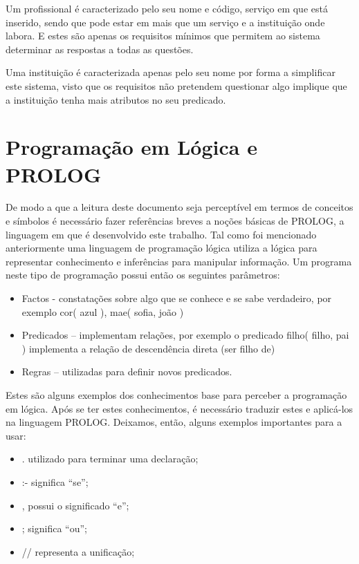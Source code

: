 Um profissional é caracterizado pelo seu nome e código, serviço em que está inserido, sendo que pode estar em mais que um serviço e a instituição onde labora. E estes são apenas os requisitos mínimos que permitem ao sistema determinar as respostas a todas as questões.

Uma instituição é caracterizada apenas pelo seu nome por forma a simplificar este sistema, visto que os requisitos não pretendem questionar algo implique que a instituição tenha mais atributos no seu predicado. 


\section{Programação em Lógica e PROLOG}
\label{p2:proglogprolog}
De modo a que a leitura deste documento seja perceptível em termos de conceitos e símbolos é necessário fazer referências breves a noções básicas de PROLOG, a linguagem em que é desenvolvido este trabalho.
Tal como foi mencionado anteriormente uma linguagem de programação lógica utiliza a lógica para representar conhecimento e inferências para manipular informação. Um programa neste tipo de programação possui então os seguintes parâmetros:

\begin{itemize}
	\item Factos - constatações sobre algo que se conhece e se sabe verdadeiro, por exemplo cor( azul ), mae( sofia, joão )
	\item Predicados – implementam relações, por exemplo o predicado filho( filho, pai ) implementa a relação de descendência direta (ser filho de)
	\item Regras – utilizadas para definir novos predicados. 
\end{itemize}

Estes são alguns exemplos dos conhecimentos base para perceber a programação em lógica.
Após se ter estes conhecimentos, é necessário traduzir estes e aplicá-los na linguagem PROLOG.
Deixamos, então, alguns exemplos importantes para a usar:

\begin{itemize}
	\item .  utilizado para terminar uma declaração;
	\item :-  significa “se”;
	\item ,  possui o significado “e”;
	\item ;  significa “ou”;
	\item //  representa a unificação;
\end{itemize}


